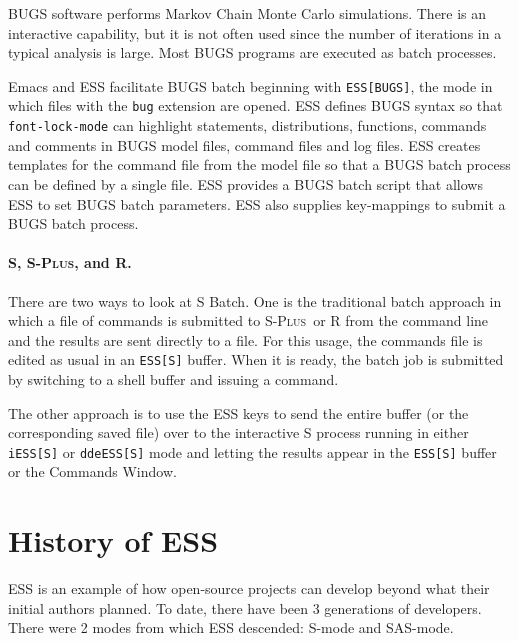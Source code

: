 \documentclass{article}
\newcommand*{\SAS}{\textsc{SAS}}
\newcommand*{\Splus}{\textsc{S-Plus}}
\newcommand{\stexttt}[1]{{\small\texttt{#1}}}
\begin{document}
BUGS software performs Markov Chain Monte Carlo simulations.  There is an 
interactive capability, but it is not often used since the number of iterations
in a typical analysis is large.
Most BUGS programs are executed as batch processes.

Emacs and ESS facilitate BUGS batch 
beginning with \stexttt{ESS[BUGS]},
the mode in which files with the \stexttt{bug} extension are opened.
ESS defines BUGS syntax so that \stexttt{font-lock-mode} can highlight
statements, distributions, functions, commands and comments in BUGS
model files, command files and log files.  ESS creates templates
for the command file from the model file so that a BUGS batch process
can be defined by a single file.
ESS provides a BUGS batch script that allows ESS to set BUGS batch 
parameters.  ESS also supplies key-mappings to submit a BUGS batch
process.  

\paragraph{S, \Splus, and R.}
There are two ways to look at S Batch.  One is the traditional batch
approach in which a file of commands is submitted to \Splus\ or R from
the command line and the results are sent directly to a file.  For
this usage, the commands file is edited as usual in an \stexttt{ESS[S]}
buffer.  When it is ready, the batch job is submitted by switching to a
shell buffer and issuing a command.

The other approach is to use the ESS keys to send the entire buffer
(or the corresponding saved file) over to the interactive S process
running in either \stexttt{iESS[S]} or \stexttt{ddeESS[S]} mode and
letting the results appear in the \stexttt{ESS[S]} buffer or the
Commands Window.


\section{History of ESS}
\label{sec:ESS:history}

ESS is an example of how open-source projects can develop beyond what 
their initial authors planned.  To date, there have been 3 generations 
of developers.
There were 2 modes from which ESS descended:  S-mode and SAS-mode.
\end{document}

